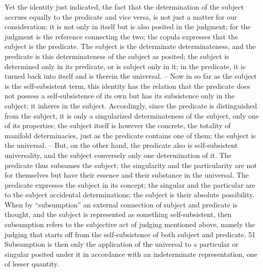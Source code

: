 Yet the identity just indicated, the fact that the determination of the
subject accrues equally to the predicate and vice versa, is not just a matter
for our consideration; it is not only in itself but is also posited in the
judgment; for the judgment is the reference connecting the two; the copula
expresses that the subject is the predicate. The subject is the determinate
determinateness, and the predicate is this determinateness of the subject as
posited; the subject is determined only in its predicate, or is subject only in
it; in the predicate, it is turned back into itself and is therein the universal. –
Now in so far as the subject is the self-subsistent term, this identity has the
relation that the predicate does not possess a self-subsistence of its own but
has its subsistence only in the subject; it inheres in the subject. Accordingly,
since the predicate is distinguished from the subject, it is only a singularized
determinateness of the subject, only one of its properties; the subject itself
is however the concrete, the totality of manifold determinacies, just as the
predicate contains one of them; the subject is the universal. – But, on the
other hand, the predicate also is self-subsistent universality, and the subject
conversely only one determination of it. The predicate thus subsumes the
subject; the singularity and the particularity are not for themselves but
have their essence and their substance in the universal. The predicate
expresses the subject in its concept; the singular and the particular are to the
subject accidental determinations; the subject is their absolute possibility.
When by “subsumption” an external connection of subject and predicate
is thought, and the subject is represented as something self-subsistent,
then subsumption refers to the subjective act of judging mentioned above,
namely the judging that starts off from the self-subsistence of both subject
and predicate. 51 Subsumption is then only the application of the universal to
a particular or singular posited under it in accordance with an indeterminate
representation, one of lesser quantity.

